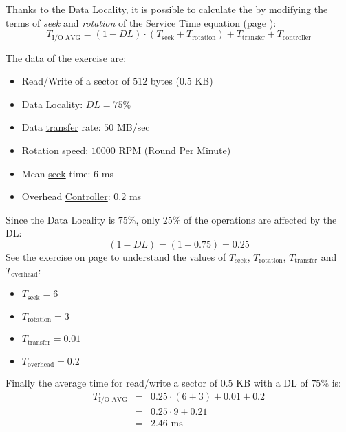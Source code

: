\highspace
Thanks to the Data Locality, it is possible to calculate the  by modifying the terms of \emph{seek} and \emph{rotation} of the Service Time equation (page \pageref{eq: Service Time}):
\begin{equation}
    T_{\text{I/O AVG}} = \left(1 - DL\right) \cdot \left(T_{\text{seek}} + T_{\text{rotation}}\right) + T_{\text{transfer}} + T_{\text{controller}}
\end{equation}


\begin{exercisebox}
    The data of the exercise are:
    \begin{itemize}
        \item Read/Write of a sector of $512$ bytes ($0.5$ KB)
        \item \underline{Data Locality}: $DL = 75\%$
        \item Data \underline{transfer} rate: $50$ MB/sec
        \item \underline{Rotation} speed: $10000$ RPM (Round Per Minute)
        \item Mean \underline{seek} time: $6$ ms
        \item Overhead \underline{Controller}: $0.2$ ms
    \end{itemize}
    Since the Data Locality is $75\%$, only $25\%$ of the operations are affected by the DL:
    \begin{equation*}
        \left(1-DL\right) = \left(1 - 0.75\right) = 0.25
    \end{equation*}
    See the exercise on page \pageref{exercise: mean service time of an I/O operation} to understand the values of $T_{\text{seek}}$, $T_{\text{rotation}}$, $T_{\text{transfer}}$ and $T_{\text{overhead}}$:
    \begin{itemize}
        \item $T_{\text{seek}} = 6$
        \item $T_{\text{rotation}} = 3$
        \item $T_{\text{transfer}} = 0.01$
        \item $T_{\text{overhead}} = 0.2$
    \end{itemize}
    Finally the average time for read/write a sector of $0.5$ KB with a DL of $75\%$ is:
    \begin{equation*}
        \begin{array}{rcl}
            T_{\text{I/O AVG}} &=& 0.25 \cdot \left(6 + 3\right) + 0.01 + 0.2 \\ [1em]
            &=& 0.25 \cdot 9 + 0.21 \\ [1em]
            &=& 2.46 \text{ ms}
        \end{array}
    \end{equation*}
\end{exercisebox}


